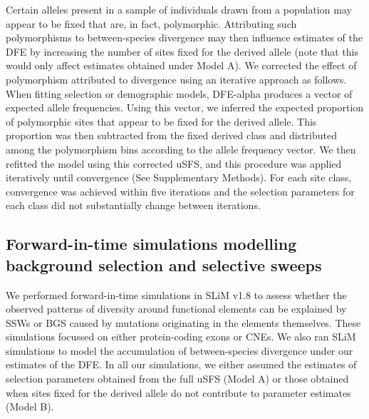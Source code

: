Certain alleles present in a sample of individuals drawn from a population may appear to be fixed that are, in fact, polymorphic. Attributing such polymorphisms to between-species divergence may then influence estimates of the DFE by increasing the number of sites fixed for the derived allele (note that this would only affect estimates obtained under Model A). We corrected the effect of polymorphism attributed to divergence using an iterative approach as follows. When fitting selection or demographic models, DFE-alpha produces a vector of expected allele frequencies. Using this vector, we inferred the expected proportion of polymorphic sites that appear to be fixed for the derived allele. This proportion was then subtracted from the fixed derived class and distributed among the polymorphism bins according to the allele frequency vector. We then refitted the model using this corrected uSFS, and this procedure was applied iteratively until convergence (See Supplementary Methods). For each site class, convergence was achieved within five iterations and the selection parameters for each class did not substantially change between iterations. 
	
\subsection{Forward-in-time simulations modelling background selection and selective sweeps}
 
We performed forward-in-time simulations in SLiM v1.8 \citep{RN148} to assess whether the observed patterns of diversity around functional elements \citep{RN122} can be explained by SSWs or BGS caused by mutations originating in the elements themselves. These simulations focussed on either protein-coding exons or CNEs. We also ran SLiM simulations to model the accumulation of between-species divergence under our estimates of the DFE. In all our simulations, we either assumed the estimates of selection parameters obtained from the full uSFS (Model A) or those obtained when sites fixed for the derived allele do not contribute to parameter estimates (Model B).

